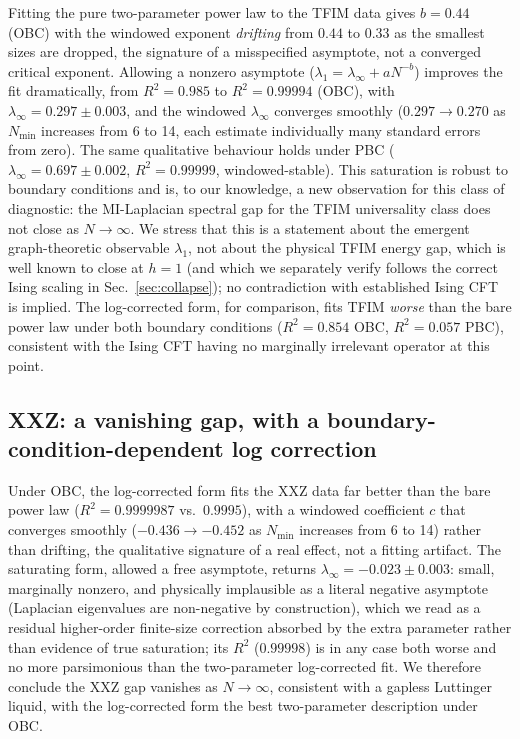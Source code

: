 \documentclass[aps,prx,reprint,amsmath,amssymb,superscriptaddress]{revtex4-2}
\begin{document}
Fitting the pure two-parameter power law to the TFIM data gives $b=0.44$ (OBC) with the windowed
exponent \emph{drifting} from $0.44$ to $0.33$ as the smallest sizes are dropped, the signature of
a misspecified asymptote, not a converged critical exponent. Allowing a nonzero asymptote
($\lambda_1=\lambda_\infty+aN^{-b}$) improves the fit dramatically, from $R^2=0.985$ to
$R^2=0.99994$ (OBC), with $\lambda_\infty=0.297\pm0.003$, and the windowed $\lambda_\infty$ converges
smoothly ($0.297\to0.270$ as $N_{\min}$ increases from 6 to 14, each estimate individually many
standard errors from zero). The same qualitative behaviour holds under PBC
($\lambda_\infty=0.697\pm0.002$, $R^2=0.99999$, windowed-stable). This saturation is robust to
boundary conditions and is, to our knowledge, a new observation for this class of diagnostic: the
MI-Laplacian spectral gap for the TFIM universality class does not close as $N\to\infty$. We stress
that this is a statement about the emergent graph-theoretic observable $\lambda_1$, not about the
physical TFIM energy gap, which is well known to close at $h=1$ (and which we separately verify
follows the correct Ising scaling in Sec.~\ref{sec:collapse}); no contradiction with established
Ising CFT is implied. The log-corrected form, for comparison, fits TFIM \emph{worse} than the bare
power law under both boundary conditions ($R^2=0.854$ OBC, $R^2=0.057$ PBC), consistent with the
Ising CFT having no marginally irrelevant operator at this point.

\subsection{XXZ: a vanishing gap, with a boundary-condition-dependent log correction}

Under OBC, the log-corrected form fits the XXZ data far better than the bare power law
($R^2=0.9999987$ vs.\ $0.9995$), with a windowed coefficient $c$ that converges smoothly
($-0.436\to-0.452$ as $N_{\min}$ increases from 6 to 14) rather than drifting, the qualitative
signature of a real effect, not a fitting artifact. The saturating form, allowed a free asymptote,
returns $\lambda_\infty=-0.023\pm0.003$: small, marginally nonzero, and physically implausible as a
literal negative asymptote (Laplacian eigenvalues are non-negative by construction), which we read
as a residual higher-order finite-size correction absorbed by the extra parameter rather than
evidence of true saturation; its $R^2$ ($0.99998$) is in any case both worse and no more
parsimonious than the two-parameter log-corrected fit. We therefore conclude the XXZ gap vanishes
as $N\to\infty$, consistent with a gapless Luttinger liquid, with the log-corrected form the best
two-parameter description under OBC.
\end{document}
